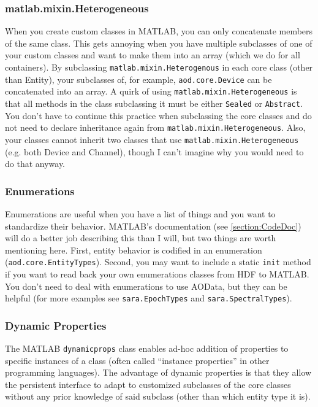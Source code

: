 \documentclass[10pt]{exam}
\newcommand\myurl[1]{\textcolor{blue}{\underline{#1}}}
\newcommand\aodclass[1]{\textcolor{codeblue}{\texttt{#1}}}
\newcommand\matclass[1]{\textcolor{codeblue}{\texttt{#1}}}
\newcommand\aodfcn[1]{\textcolor{darkteal}{\texttt{#1}}}
\begin{document}
	\subsubsection{matlab.mixin.Heterogeneous}
		\label{subsubsection:Heterogeneous}
		\noindent When you create custom classes in MATLAB, you can only concatenate members of the same class. This gets annoying when you have multiple subclasses of one of your custom classes and want to make them into an array (which we do for all containers). By subclassing \matclass{matlab.mixin.Heterogenous} in each core class (other than Entity), your subclasses of, for example, \aodclass{aod.core.Device} can be concatenated into an array. A quirk of using \matclass{matlab.mixin.Heterogeneous} is that all methods in the class subclassing it must be either \texttt{Sealed} or \texttt{Abstract}. You don't have to continue this practice when subclassing the core classes and do not need to declare inheritance again from \matclass{matlab.mixin.Heterogeneous}. Also, your classes cannot inherit two classes that use \matclass{matlab.mixin.Heterogeneous} (e.g. both Device and Channel), though I can't imagine why you would need to do that anyway.
	\subsubsection{Enumerations}
		\label{subsubsection:Enum}
		\noindent Enumerations are useful when you have a list of things and you want to standardize their behavior. MATLAB's documentation (see \myurl{\ref{section:CodeDoc}}) will do a better job describing this than I will, but two things are worth mentioning here. First, entity behavior is codified in an enumeration (\aodclass{aod.core.EntityTypes}). Second, you may want to include a static \aodfcn{init} method if you want to read back your own enumerations classes from HDF to MATLAB. You don't need to deal with enumerations to use AOData, but they can be helpful (for more examples see \aodclass{sara.EpochTypes} and \aodclass{sara.SpectralTypes}).	
		
	\subsubsection{Dynamic Properties}
		\label{subsubsection:DynProps}
		\noindent The MATLAB \aodclass{dynamicprops} class enables ad-hoc addition of properties to specific instances of a class (often called ``instance properties'' in other programming languages). The advantage of dynamic properties is that they allow the persistent interface to adapt to customized subclasses of the core classes without any prior knowledge of said subclass (other than which entity type it is). 
\end{document}
